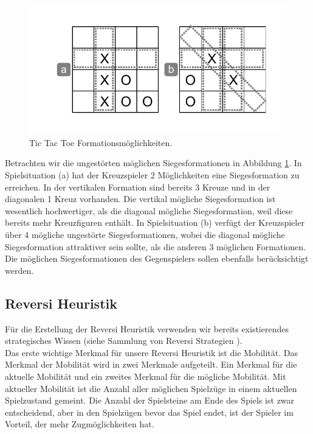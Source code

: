 \begin{figure}[!htbp]
  \centering
  \includegraphics[scale = 0.7]{inhalt/abbildungen/tictactoe_formations.pdf}
  \caption{Tic Tac Toe Formationsmöglichkeiten.}
  \label{fig:tictactoe_formations}
\end{figure}

Betrachten wir die ungestörten möglichen Siegesformationen in Abbildung \ref{fig:tictactoe_formations}. In Spielsituation (a) hat der Kreuzspieler 2 Möglichkeiten eine Siegesformation zu erreichen. In der vertikalen Formation sind bereits 3 Kreuze und in der diagonalen 1 Kreuz vorhanden. Die vertikal mögliche Siegesformation ist wesentlich hochwertiger, als die diagonal mögliche Siegesformation, weil diese bereits mehr Kreuzfiguren enthält. In Spielsituation (b) verfügt der Kreuzspieler über 4 mögliche ungestörte Siegesformationen, wobei die diagonal mögliche Siegesformation attraktiver sein sollte, als die anderen 3 möglichen Formationen. Die möglichen Siegesformationen des Gegenspielers sollen ebenfalls berücksichtigt werden.

\subsection{Reversi Heuristik}
Für die Erstellung der Reversi Heuristik verwenden wir bereits existierendes strategisches Wissen (siehe Sammlung von Reversi Strategien \cite{MacGuire}). \\

Das erste wichtige Merkmal für unsere Reversi Heuristik ist die Mobilität. Das Merkmal der Mobilität wird in zwei Merkmale aufgeteilt. Ein Merkmal für die aktuelle Mobilität und ein zweites Merkmal für die mögliche Mobilität. Mit aktueller Mobilität ist die Anzahl aller möglichen Spielzüge in einem aktuellen Spielzustand gemeint. Die Anzahl der Spielsteine am Ende des Spiels ist zwar entscheidend, aber in den Spielzügen bevor das Spiel endet, ist der Spieler im Vorteil, der mehr Zugmöglichkeiten hat. \\

